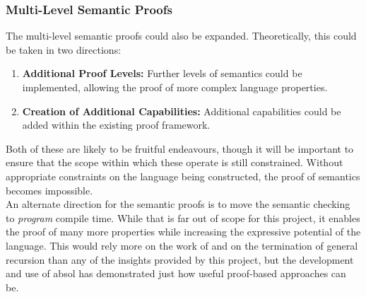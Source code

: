 
\subsubsection{Multi-Level Semantic Proofs} %
\label{ssub:multi_level_semantic_proofs}
The multi-level semantic proofs could also be expanded.
Theoretically, this could be taken in two directions:
\begin{enumerate}
    \item \textbf{Additional Proof Levels:} Further levels of semantics could be implemented, allowing the proof of more complex language properties.
    \item \textbf{Creation of Additional Capabilities:} Additional capabilities could be added within the existing proof framework.
\end{enumerate}

Both of these are likely to be fruitful endeavours, though it will be important to ensure that the scope within which these operate is still constrained.
Without appropriate constraints on the language being constructed, the proof of semantics becomes impossible.\\

An alternate direction for the semantic proofs is to move the semantic checking to \textit{program} compile time.
While that is far out of scope for this project, it enables the proof of many more properties while increasing the expressive potential of the language.
This would rely more on the work of \citet{hinze2010reasoning} and \citet{nordstrom1988terminating} on the termination of general recursion than any of the insights provided by this project, but the development and use of \gls{absol} has demonstrated just how useful proof-based approaches can be.



